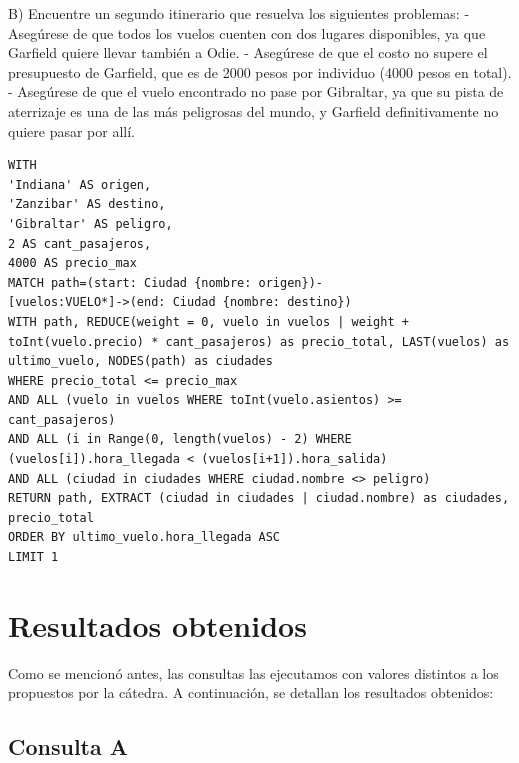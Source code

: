 \documentclass[a4paper,11pt]{article}
\begin{document}
B) Encuentre un segundo itinerario que resuelva los siguientes problemas:
- Asegúrese de que todos los vuelos cuenten con dos lugares disponibles, ya que Garfield quiere llevar también a Odie.
- Asegúrese de que el costo no supere el presupuesto de Garfield, que es de 2000 pesos por individuo (4000 pesos en total).
- Asegúrese de que el vuelo encontrado no pase por Gibraltar, ya que su pista de aterrizaje es una de las más peligrosas del mundo, y Garfield definitivamente no quiere pasar por allí.
\newpage
\begin{lstlisting}[style=neo4j]
WITH
'Indiana' AS origen,
'Zanzibar' AS destino,
'Gibraltar' AS peligro,
2 AS cant_pasajeros,
4000 AS precio_max
MATCH path=(start: Ciudad {nombre: origen})-
[vuelos:VUELO*]->(end: Ciudad {nombre: destino})
WITH path, REDUCE(weight = 0, vuelo in vuelos | weight +
toInt(vuelo.precio) * cant_pasajeros) as precio_total, LAST(vuelos) as
ultimo_vuelo, NODES(path) as ciudades
WHERE precio_total <= precio_max
AND ALL (vuelo in vuelos WHERE toInt(vuelo.asientos) >=
cant_pasajeros)
AND ALL (i in Range(0, length(vuelos) - 2) WHERE
(vuelos[i]).hora_llegada < (vuelos[i+1]).hora_salida)
AND ALL (ciudad in ciudades WHERE ciudad.nombre <> peligro)
RETURN path, EXTRACT (ciudad in ciudades | ciudad.nombre) as ciudades,
precio_total
ORDER BY ultimo_vuelo.hora_llegada ASC
LIMIT 1
\end{lstlisting}

\newpage
\section*{Resultados obtenidos}
Como se mencionó antes, las consultas las ejecutamos con valores distintos a los propuestos por la cátedra.
A continuación, se detallan los resultados obtenidos:
\linebreak
\subsection*{Consulta A}
\end{document}
